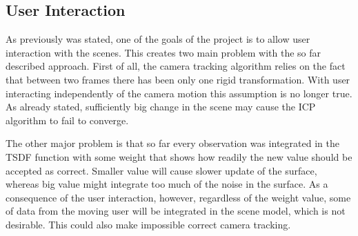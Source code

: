 \documentclass[12pt, a4paper]{article}
\theoremstyle{plain}
\begin{document}
  \subsection{User Interaction} %
  \label{sub:User Interaction}
    As previously was stated, one of the goals of the project is to allow user
    interaction with the scenes. This creates two main problem with the so far
    described approach. First of all, the camera tracking algorithm relies on
    the fact that between two frames there has been only one rigid
    transformation. With user interacting independently of the camera motion
    this assumption is no longer true. As already stated, sufficiently big
    change in the scene may cause the ICP algorithm to fail to converge.

    The other major problem is that so far every observation was integrated in
    the TSDF function with some weight that shows how readily the new value
    should be accepted as correct. Smaller value will cause slower update of the
    surface, whereas big value might integrate too much of the noise in the
    surface. As a consequence of the user interaction, however, regardless of
    the weight value, some of data from the moving user will be integrated in
    the scene model, which is not desirable. This could also make impossible
    correct camera tracking.
\end{document}
